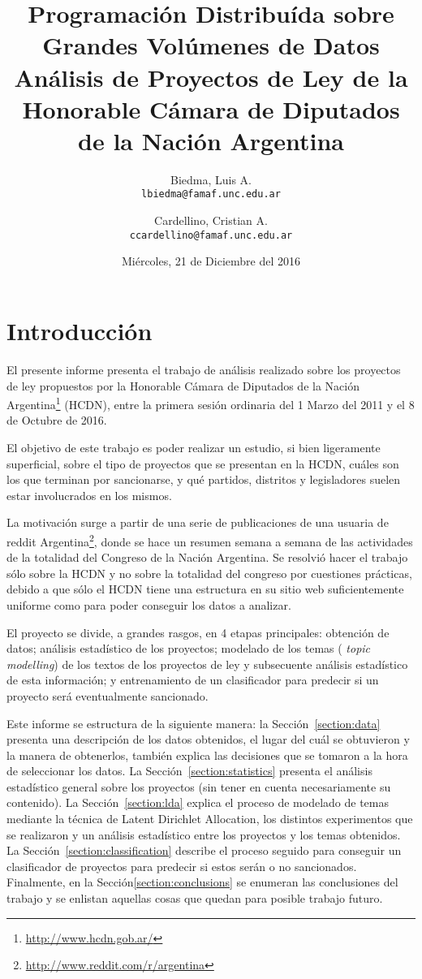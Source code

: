 \documentclass[12pt,a4paper,titlepage]{article}
\title{
  \large{Programación Distribuída sobre Grandes Volúmenes de Datos}\\
  \Large{Análisis de Proyectos de Ley de la Honorable Cámara de Diputados de la Nación Argentina}
}
\author{Biedma, Luis A.\\         \texttt{lbiedma@famaf.unc.edu.ar}
        \and
        Cardellino, Cristian A.\\ \texttt{ccardellino@famaf.unc.edu.ar}}
\date{Miércoles, 21 de Diciembre del 2016}
\begin{document}
  \maketitle

  \section{Introducción}\label{section:introduction}

  El presente informe presenta el trabajo de análisis realizado sobre los
  proyectos de ley propuestos por la Honorable Cámara de Diputados de la Nación
  Argentina\footnote{\url{http://www.hcdn.gob.ar/}} (HCDN), entre la primera
  sesión ordinaria del 1 Marzo del 2011 y el 8 de Octubre de 2016.

  El objetivo de este trabajo es poder realizar un estudio, si bien ligeramente
  superficial, sobre el tipo de proyectos que se presentan en la HCDN, cuáles
  son los que terminan por sancionarse, y qué partidos, distritos y
  legisladores suelen estar involucrados en los mismos.

  La motivación surge a partir de una serie de publicaciones de una usuaria de
  reddit Argentina\footnote{\url{http://www.reddit.com/r/argentina}}, donde se
  hace un resumen semana a semana de las actividades de la totalidad del
  Congreso de la Nación Argentina.  Se resolvió hacer el trabajo sólo sobre la
  HCDN y no sobre la totalidad del congreso por cuestiones prácticas, debido a
  que sólo el HCDN tiene una estructura en su sitio web suficientemente
  uniforme como para poder conseguir los datos a analizar.

  El proyecto se divide, a grandes rasgos, en 4 etapas principales: obtención
  de datos; análisis estadístico de los proyectos; modelado de los temas ({\em
  topic modelling}) de los textos de los proyectos de ley y subsecuente
  análisis estadístico de esta información; y entrenamiento de un clasificador
  para predecir si un proyecto será eventualmente sancionado.

  Este informe se estructura de la siguiente manera: la
  Sección~\ref{section:data} presenta una descripción de los datos obtenidos,
  el lugar del cuál se obtuvieron y la manera de obtenerlos, también explica
  las decisiones que se tomaron a la hora de seleccionar los datos. La
  Sección~\ref{section:statistics} presenta el análisis estadístico general
  sobre los proyectos (sin tener en cuenta necesariamente su contenido). La
  Sección~\ref{section:lda} explica el proceso de modelado de temas mediante la
  técnica de Latent Dirichlet Allocation, los distintos experimentos que se
  realizaron y un análisis estadístico entre los proyectos y los temas
  obtenidos.
  La Sección~\ref{section:classification} describe el proceso seguido para
  conseguir un clasificador de proyectos para predecir si estos serán o no
  sancionados.
  Finalmente, en la Sección\ref{section:conclusions} se enumeran las
  conclusiones del trabajo y se enlistan aquellas cosas que quedan para posible
  trabajo futuro.
\end{document}
